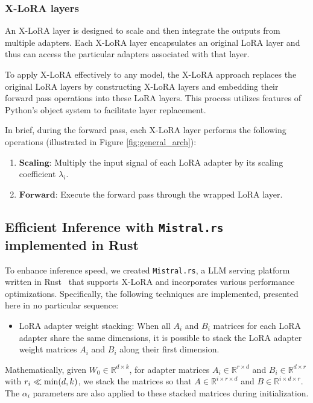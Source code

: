 \subsubsection{X-LoRA layers} An X-LoRA layer is designed to scale and then integrate the outputs from multiple adapters. Each X-LoRA layer encapsulates an original LoRA layer and thus can access the particular adapters associated with that layer.

To apply X-LoRA effectively to any model, the X-LoRA approach replaces the original LoRA layers by constructing X-LoRA layers and embedding their forward pass operations into these LoRA layers. This process utilizes features of Python’s object system to facilitate layer replacement.

In brief, during the forward pass, each X-LoRA layer performs the following operations (illustrated in Figure \ref{fig:general_arch}):

\begin{enumerate}
    \item $\mathbf{Scaling}$: Multiply the input signal of each LoRA adapter by its scaling coefficient $\lambda_i$.
    \item $\mathbf{Forward}$: Execute the forward pass through the wrapped LoRA layer.
\end{enumerate}

\subsection{Efficient Inference with \texttt{Mistral.rs} implemented in Rust} To enhance inference speed, we created \texttt{Mistral.rs}, a LLM serving platform written in Rust~\cite{matsakis2014rust} that supports X-LoRA and incorporates various performance optimizations. Specifically, the following techniques are implemented, presented here in no particular sequence:

\begin{itemize}
    \item LoRA adapter weight stacking: When all $A_i$ and $B_i$ matrices for each LoRA adapter share the same dimensions, it is possible to stack the LoRA adapter weight matrices $A_i$ and $B_i$ along their first dimension.
\end{itemize}

Mathematically, given $W_0 \in \mathbb{R}^{d \times k}$, for adapter matrices $A_i \in \mathbb{R}^{r \times d}$ and $B_i \in \mathbb{R}^{d \times r}$ with $r_i \ll {\rm min} (d,k)$, we stack the matrices so that $A \in \mathbb{R}^{i \times r \times d}$ and $B \in \mathbb{R}^{i \times d \times r}$. The $\alpha_i$ parameters are also applied to these stacked matrices during initialization.

